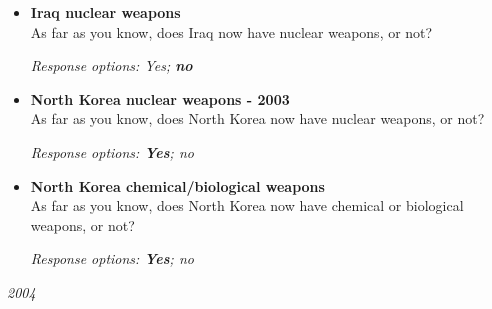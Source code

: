 \documentclass[12pt, letterpaper]{article}
\begin{document}
\begin{itemize} \item \textbf{Iraq nuclear weapons}\\
As far as you know, does Iraq now have nuclear weapons, or not?

\textit{Response options: Yes; \textbf{no}} 
\end{itemize}

\begin{itemize} \item \textbf{North Korea nuclear weapons - 2003}\\
As far as you know, does North Korea now have nuclear weapons, or not?

\textit{Response options: \textbf{Yes}; no} 
\end{itemize}

\begin{itemize} \item \textbf{North Korea chemical/biological weapons}\\
As far as you know, does North Korea now have chemical or biological weapons, or not?

\textit{Response options: \textbf{Yes}; no} 
\end{itemize}

 \large \noindent \textit{2004} 
\normalsize
\end{document}
